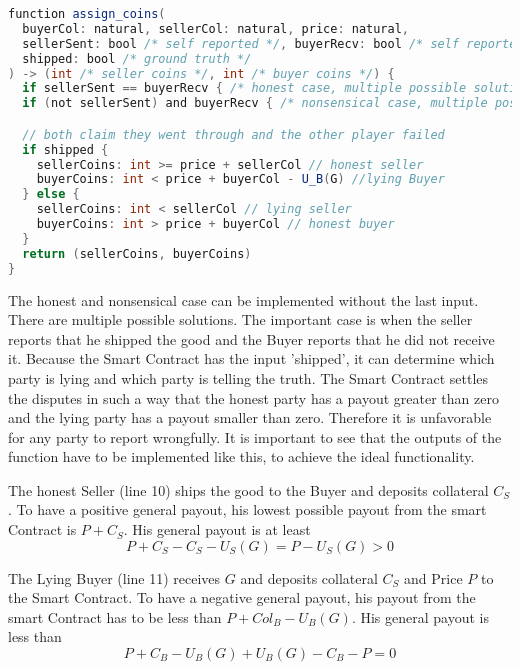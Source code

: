\documentclass{cacthesis}
\begin{document}

\begin{lstlisting}[language=java]
function assign_coins(
  buyerCol: natural, sellerCol: natural, price: natural,
  sellerSent: bool /* self reported */, buyerRecv: bool /* self reported */, 
  shipped: bool /* ground truth */
) -> (int /* seller coins */, int /* buyer coins */) {
  if sellerSent == buyerRecv { /* honest case, multiple possible solutions  */ }
  if (not sellerSent) and buyerRecv { /* nonsensical case, multiple possible solutions */ }

  // both claim they went through and the other player failed
  if shipped {
    sellerCoins: int >= price + sellerCol // honest seller
    buyerCoins: int < price + buyerCol - U_B(G) //lying Buyer
  } else {
    sellerCoins: int < sellerCol // lying seller
    buyerCoins: int > price + buyerCol // honest buyer
  }
  return (sellerCoins, buyerCoins)
}
\end{lstlisting}
The honest and nonsensical case can be implemented without the last input. There are multiple possible solutions.\newline
The important case is when the seller reports that he shipped the good and the Buyer reports that he did not receive it. Because the Smart Contract has the input 'shipped', it can determine which party is lying and which party is telling the truth.\newline
The Smart Contract settles the disputes in such a way that the honest party has a payout greater than zero and the lying party has a payout smaller than zero. Therefore it is unfavorable for any party to report wrongfully.\newline
It is important to see that the outputs of the function have to be implemented like this, to achieve the ideal functionality.\newline

The honest Seller (line 10) ships the good to the Buyer and deposits collateral $C_S$. To have a positive general payout, his lowest possible payout from the smart Contract is $P + C_S$. His general payout is at least
\[P + C_S - C_S - U_S(G) = P - U_S(G) > 0\]

The Lying Buyer (line 11) receives $G$ and deposits collateral $C_S$ and Price $P$ to the Smart Contract. To have a negative general payout, his payout from the smart Contract has to be less than $P + Col_B - U_B(G)$. His general payout is less than
\[P + C_B - U_B(G) + U_B(G) - C_B -P = 0\]
\end{document}
